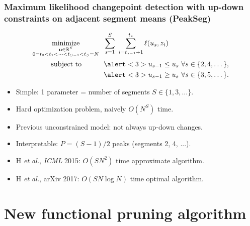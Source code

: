 \documentclass{beamer}
\DeclareMathOperator*{\minimize}{minimize}
\newcommand{\RR}{\mathbb R}
\begin{document}
\begin{frame}
  \frametitle{Maximum likelihood changepoint detection with up-down constraints on adjacent segment means (PeakSeg)}
    
\vskip -1.4cm
\begin{align*}
    \minimize_{\substack{
  \mathbf u\in\RR^{S}
\\
   0=t_0<t_1<\cdots<t_{S-1}<t_S=N
  }} &\ \ 
    \sum_{s=1}^S\  \sum_{i=t_{s-1}+1}^{t_s} \ell( u_s,  z_i) 
\\
      \text{subject to \hskip 0.75cm} &\ \ \alert<3>{u_{s-1} \leq u_s\ \forall s\in\{2,4,\dots\},}
  \nonumber\\
  &\ \ \alert<3>{u_{s-1} \geq u_s\ \forall s\in\{3,5,\dots\}.}
  \nonumber 
\end{align*}
\vskip -0.4cm
\begin{itemize}  
\item Simple: 1 parameter = number of segments $S\in\{1,3,\dots\}$.
\item Hard optimization problem, naively $O(N^S)$ time.
\item \alert<2>{Previous unconstrained model: not always up-down changes.}
\item \alert<3>{Interpretable: $P=(S-1)/2$ peaks (segments 2, 4, ...).}
\item H {\it et al.}, {\it ICML} 2015: $O(SN^2)$ time approximate
  algorithm. 
\item H {\it et al.}, arXiv 2017: $O(SN\log N)$ time optimal algorithm.
\end{itemize}
\end{frame} 

\section{New functional pruning algorithm}
\end{document}
